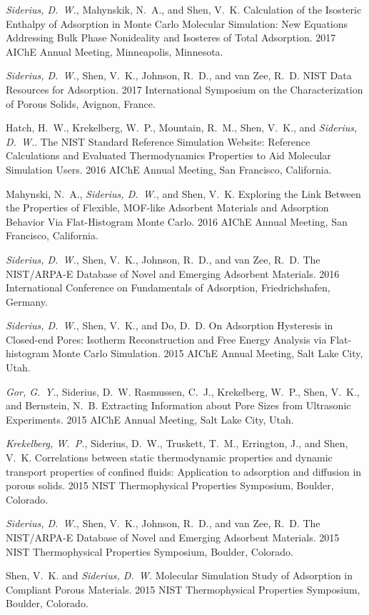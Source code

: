 {\it Siderius, D.~W.}, Mahynskik, N.~A., and Shen, V.~K. Calculation of the Isosteric Enthalpy of Adsorption in Monte Carlo Molecular Simulation: New Equations Addressing Bulk Phase Nonideality and Isosteres of Total Adsorption. 2017 AIChE Annual Meeting, Minneapolis, Minnesota.

{\it Siderius, D.~W.}, Shen, V.~K., Johnson, R.~D., and van Zee, R.~D. NIST Data Resources for Adsorption. 2017 International Symposium on the Characterization of Porous Solids, Avignon, France.

Hatch, H.~W., Krekelberg, W.~P., Mountain, R.~M., Shen, V.~K., and {\it Siderius, D.~W.}. The NIST Standard Reference Simulation Website: Reference Calculations and Evaluated Thermodynamics Properties to Aid Molecular Simulation Users. 2016 AIChE Annual Meeting, San Francisco, California.

Mahynski, N.~A., {\it Siderius, D.~W.}, and Shen, V.~K. Exploring the Link Between the Properties of Flexible, MOF-like Adsorbent Materials and Adsorption Behavior Via Flat-Histogram Monte Carlo. 2016 AIChE Annual Meeting, San Francisco, California.

{\it Siderius, D.~W.}, Shen, V.~K., Johnson, R.~D., and van Zee, R.~D. The NIST/ARPA-E Database of Novel and Emerging Adsorbent Materials. 2016 International Conference on Fundamentals of Adsorption, Friedrichshafen, Germany.

{\it Siderius, D.~W.}, Shen, V.~K., and Do, D.~D. On Adsorption Hysteresis in Closed-end Pores: Isotherm Reconstruction and Free Energy Analysis via Flat-histogram Monte Carlo Simulation. 2015 AIChE Annual Meeting, Salt Lake City, Utah.

{\it Gor, G.~Y.}, Siderius, D.~W. Rasmussen, C.~J., Krekelberg, W.~P., Shen, V.~K., and Bernstein, N.~B. Extracting Information about Pore Sizes from Ultrasonic Experiments. 2015 AIChE Annual Meeting, Salt Lake City, Utah.

{\it Krekelberg, W.~P.}, Siderius, D.~W., Truskett, T.~M., Errington, J., and Shen, V.~K. Correlations between static thermodynamic properties and dynamic transport properties of confined fluids: Application to adsorption and diffusion in porous solids. 2015 NIST Thermophysical Properties Symposium, Boulder, Colorado.

{\it Siderius, D.~W.}, Shen, V.~K., Johnson, R.~D., and van Zee, R.~D. The NIST/ARPA-E Database of Novel and Emerging Adsorbent Materials. 2015 NIST Thermophysical Properties Symposium, Boulder, Colorado.

Shen, V.~K. and {\it Siderius, D.~W.} Molecular Simulation Study of Adsorption in Compliant Porous Materials. 2015 NIST Thermophysical Properties Symposium, Boulder, Colorado.


